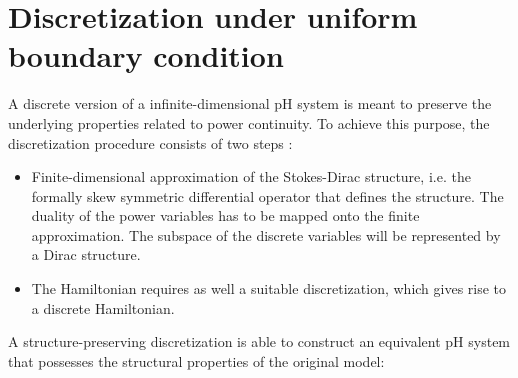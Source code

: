 \section{Discretization under uniform boundary condition}
A discrete version of a infinite-dimensional pH system is meant to preserve the underlying properties related to power continuity. To achieve this purpose, the discretization procedure consists of two steps \cite{kotyczka2018weak}:
\begin{itemize}
	\item Finite-dimensional approximation of the Stokes-Dirac structure, i.e. the formally skew symmetric differential operator that defines the structure. The duality of the power variables has to be mapped onto the finite approximation. The subspace of the discrete variables will be represented by a Dirac structure. 
	\item The Hamiltonian requires as well a suitable discretization, which gives rise to a discrete Hamiltonian. 
\end{itemize} 
A structure-preserving discretization is able to construct an equivalent pH system that possesses the structural properties of the original model:
